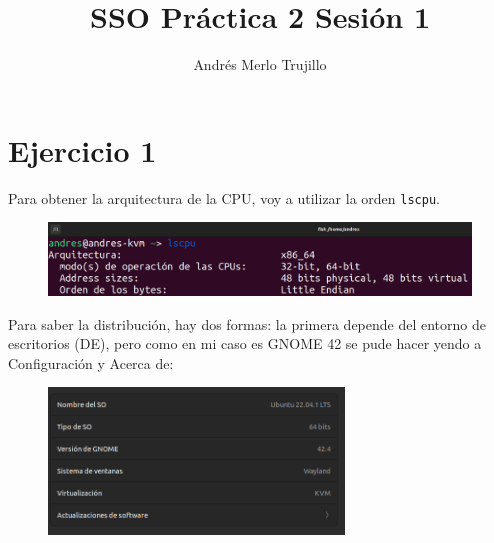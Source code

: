 \documentclass{article}
\title{SSO Práctica 2 Sesión 1}
\author{Andrés Merlo Trujillo}
\date{}
\begin{document}
\maketitle

\tableofcontents

\newpage

\section*{Ejercicio 1}

Para obtener la arquitectura de la CPU, voy a utilizar la orden \verb|lscpu|.

\begin{figure}[H]
    \includegraphics[width=\textwidth]{imagenes/Captura desde 2022-11-23 10-33-11.png}
\end{figure}

Para saber la distribución, hay dos formas: la primera depende del entorno de escritorios (DE), pero como en mi caso es GNOME 42 se pude hacer yendo a Configuración y Acerca de:

\begin{figure}[H]
    \centering
    \includegraphics[width=0.7\textwidth]{imagenes/Captura desde 2022-11-23 10-37-46.png}
\end{figure}
\end{document}
